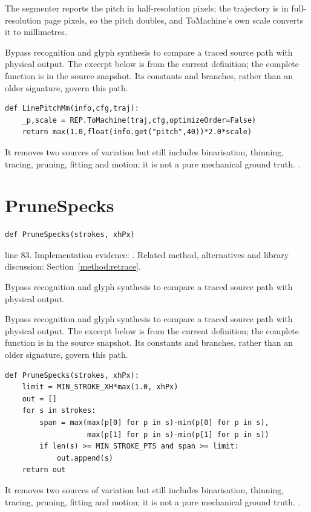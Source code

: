 The segmenter reports the pitch in half-resolution pixels; the trajectory is in full-resolution page pixels, so the pitch doubles, and ToMachine's own scale converts it to millimetres.


Bypass recognition and glyph synthesis to compare a traced source path with physical output. The excerpt below is from the current definition; the complete function is in the source snapshot. Its constants and branches, rather than an older signature, govern this path.


\begin{lstlisting}[style=plain]
def LinePitchMm(info,cfg,traj):
    _p,scale = REP.ToMachine(traj,cfg,optimizeOrder=False)
    return max(1.0,float(info.get("pitch",40))*2.0*scale)
\end{lstlisting}
It removes two sources of variation but still includes binarisation, thinning, tracing, pruning, fitting and motion; it is not a pure mechanical ground truth. \cite{code2026,zhangsuen1984,douglaspeucker1973}.


\section{PruneSpecks}\label{fn:retrace:PruneSpecks}
\begin{lstlisting}[style=sig]
def PruneSpecks(strokes, xhPx)
\end{lstlisting}
 line 83. Implementation evidence: \cite{code2026}. Related method, alternatives and library discussion: Section~\ref{method:retrace}.


Bypass recognition and glyph synthesis to compare a traced source path with physical output.


Bypass recognition and glyph synthesis to compare a traced source path with physical output. The excerpt below is from the current definition; the complete function is in the source snapshot. Its constants and branches, rather than an older signature, govern this path.


\begin{lstlisting}[style=plain]
def PruneSpecks(strokes, xhPx):
    limit = MIN_STROKE_XH*max(1.0, xhPx)
    out = []
    for s in strokes:
        span = max(max(p[0] for p in s)-min(p[0] for p in s),
                   max(p[1] for p in s)-min(p[1] for p in s))
        if len(s) >= MIN_STROKE_PTS and span >= limit:
            out.append(s)
    return out
\end{lstlisting}
It removes two sources of variation but still includes binarisation, thinning, tracing, pruning, fitting and motion; it is not a pure mechanical ground truth. \cite{code2026,zhangsuen1984,douglaspeucker1973}.


